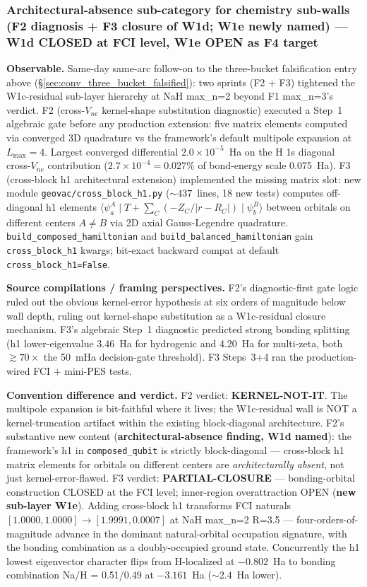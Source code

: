 \documentclass[11pt]{article}
\begin{document}
\subsubsection{Architectural-absence sub-category for chemistry sub-walls
(F2 diagnosis + F3 closure of W1d; W1e newly named) --- W1d CLOSED at FCI
level, W1e OPEN as F4 target}
\label{sec:conv_w1c_f2_f3}

\textbf{Observable.} Same-day same-arc follow-on to the three-bucket
falsification entry above (\S\ref{sec:conv_three_bucket_falsified}): two
sprints (F2 + F3) tightened the W1c-residual sub-layer hierarchy at NaH
max\_n=2 beyond F1 max\_n=3's verdict. F2 (cross-$V_{ne}$ kernel-shape
substitution diagnostic) executed a Step~1 algebraic gate before any
production extension: five matrix elements computed via converged 3D
quadrature vs the framework's default multipole expansion at
$L_\text{max}=4$. Largest converged differential
$2.0\times 10^{-5}$~Ha on the H 1s diagonal cross-$V_{ne}$ contribution
($2.7\times 10^{-4} = 0.027\%$ of bond-energy scale 0.075~Ha). F3
(cross-block h1 architectural extension) implemented the missing matrix
slot: new module \texttt{geovac/cross\_block\_h1.py} ($\sim 437$~lines, 18
new tests) computes off-diagonal h1 elements
$\langle\psi_a^A \mid T + \sum_C (-Z_C/|r-R_C|) \mid \psi_b^B\rangle$
between orbitals on different centers $A \neq B$ via 2D axial
Gauss-Legendre quadrature. \texttt{build\_composed\_hamiltonian} and
\texttt{build\_balanced\_hamiltonian} gain \texttt{cross\_block\_h1}
kwargs; bit-exact backward compat at default \texttt{cross\_block\_h1=False}.

\textbf{Source compilations / framing perspectives.} F2's diagnostic-first
gate logic ruled out the obvious kernel-error hypothesis at six orders of
magnitude below wall depth, ruling out kernel-shape substitution as a
W1c-residual closure mechanism. F3's algebraic Step~1 diagnostic predicted
strong bonding splitting (h1 lower-eigenvalue 3.46~Ha for hydrogenic and
4.20~Ha for multi-zeta, both $\gtrsim 70\times$ the 50~mHa decision-gate
threshold). F3 Steps~3+4 ran the production-wired FCI + mini-PES tests.

\textbf{Convention difference and verdict.} F2 verdict:
\textbf{KERNEL-NOT-IT}. The multipole expansion is bit-faithful where it
lives; the W1c-residual wall is NOT a kernel-truncation artifact within
the existing block-diagonal architecture. F2's substantive new content
(\textbf{architectural-absence finding, W1d named}): the framework's h1 in
\texttt{composed\_qubit} is strictly block-diagonal --- cross-block h1
matrix elements for orbitals on different centers are \emph{architecturally
absent}, not just kernel-error-flawed. F3 verdict: \textbf{PARTIAL-CLOSURE}
--- bonding-orbital construction CLOSED at the FCI level; inner-region
overattraction OPEN (\textbf{new sub-layer W1e}). Adding cross-block h1
transforms FCI naturals $[1.0000, 1.0000] \to [\mathbf{1.9991},
\mathbf{0.0007}]$ at NaH max\_n=2 R=3.5 --- four-orders-of-magnitude advance
in the dominant natural-orbital occupation signature, with the bonding
combination as a doubly-occupied ground state. Concurrently the h1 lowest
eigenvector character flips from H-localized at $-0.802$~Ha to bonding
combination Na/H = 0.51/0.49 at $-3.161$~Ha ($\sim 2.4$~Ha lower).
\end{document}
